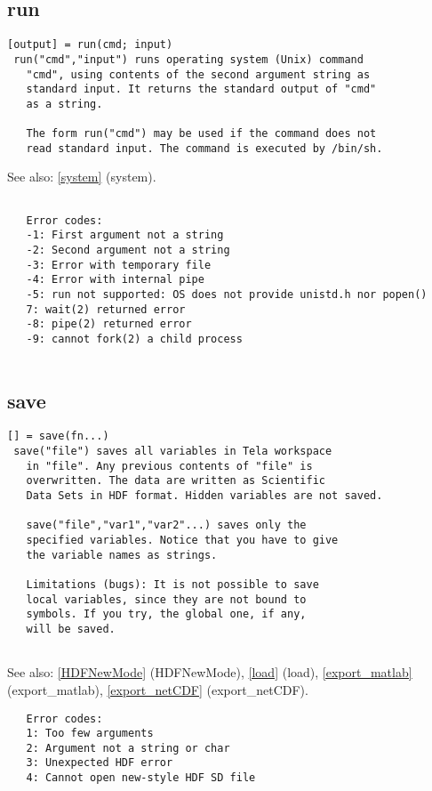 \documentclass[a4paper]{article}
\begin{document}
\subsection{run\label{run}}

\begin{tscreen}
\begin{verbatim}
[output] = run(cmd; input)
 run("cmd","input") runs operating system (Unix) command
   "cmd", using contents of the second argument string as
   standard input. It returns the standard output of "cmd"
   as a string.

   The form run("cmd") may be used if the command does not
   read standard input. The command is executed by /bin/sh.
\end{verbatim}

See also: \ref{system} {(system)}.
\begin{verbatim}

   Error codes:
   -1: First argument not a string
   -2: Second argument not a string
   -3: Error with temporary file
   -4: Error with internal pipe
   -5: run not supported: OS does not provide unistd.h nor popen()
   7: wait(2) returned error
   -8: pipe(2) returned error
   -9: cannot fork(2) a child process
   
\end{verbatim}
\end{tscreen}





\subsection{save\label{save}}

\begin{tscreen}
\begin{verbatim}
[] = save(fn...)
 save("file") saves all variables in Tela workspace
   in "file". Any previous contents of "file" is
   overwritten. The data are written as Scientific
   Data Sets in HDF format. Hidden variables are not saved.
   
   save("file","var1","var2"...) saves only the
   specified variables. Notice that you have to give
   the variable names as strings.
   
   Limitations (bugs): It is not possible to save
   local variables, since they are not bound to
   symbols. If you try, the global one, if any,
   will be saved.
   
\end{verbatim}

See also: \ref{HDFNewMode} {(HDFNewMode)}, \ref{load} {(load)}, \ref{export_matlab} {(export\_matlab)}, \ref{export_netCDF} {(export\_netCDF)}.
\begin{verbatim}
   Error codes:
   1: Too few arguments
   2: Argument not a string or char
   3: Unexpected HDF error
   4: Cannot open new-style HDF SD file
\end{verbatim}
\end{tscreen}
\end{document}
